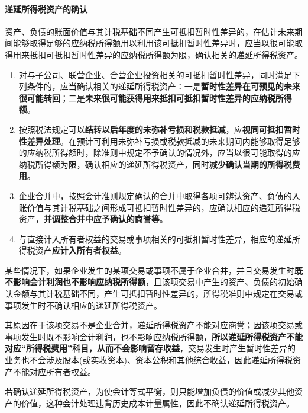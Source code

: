\documentclass[UTF8,12pt]{ctexart}
\numberwithin{equation}{section} %
\numberwithin{figure}{section}
\numberwithin{table}{section}
\begin{document}
	\paragraph{递延所得税资产的确认}
	资产、负债的账面价值与其计税基础不同产生可抵扣暂时性差异的，在估计未来期间能够取得足够的应纳税所得额用以利用该可抵扣暂时性差异时，应当以很可能取得用来抵扣可抵扣暂时性差异的应纳税所得额为限，确认相关的递延所得税资产。
	\begin{enumerate}
		\item 对与子公司、联营企业、合营企业投资相关的可抵扣暂时性差异，同时满足下列条件的，应当确认相关的递延所得税资产：一是\textbf{暂时性差异在可预见的未来很可能转回}；二是\textbf{未来很可能获得用来抵扣可抵扣暂时性差异的应纳税所得额}。
		
		\item 按照税法规定可以\textbf{结转以后年度的未弥补亏损和税款抵减}，应\textbf{视同可抵扣暂时性差异处理}。在预计可利用未弥补亏损或税款抵减的未来期间内能够取得足够的应纳税所得额时，除准则中规定不予确认的情况外，应当以很可能取得的应纳税所得额为限，确认相应的递延所得税资产，同时\textbf{减少确认当期的所得税费用}。
		
		\item 企业合并中，按照会计准则规定确认的合并中取得各项可辨认资产、负债的入账价值与其计税基础之间形成可抵扣暂时性差异的，应确认相应的递延所得税资产，\textbf{并调整合并中应予确认的商誉等}。
		
		\item 与直接计入所有者权益的交易或事项相关的可抵扣暂时性差异，相应的递延所得税资产\textbf{应计入所有者权益}。
		
	\end{enumerate}
	
	某些情况下，如果企业发生的某项交易或事项不属于企业合并，并且交易发生时\textbf{既不影响会计利润也不影响应纳税所得额}，且该项交易中产生的资产、负债的初始确认金额与其计税基础不同，产生可抵扣暂时性差异的，所得税准则中规定在交易或事项发生时不确认相应的递延所得税资产。
	
	其原因在于该项交易不是企业合并，递延所得税资产不能对应商誉；因该项交易或事项发生时既不影响会计利润，也不影响应纳税所得额，\textbf{所以递延所得税资产不能对应“所得税费用”科目，从而不会影响留存收益}，交易发生时产生暂时性差异的业务也不会涉及股本(或实收资本)、资本公积和其他综合收益，因此递延所得税资产不能对应所有者权益。
	
	若确认递延所得税资产，为使会计等式平衡，则只能增加负债的价值或减少其他资产的价值，这种会计处理违背历史成本计量属性，因此不确认递延所得税资产。
	
\end{document}
